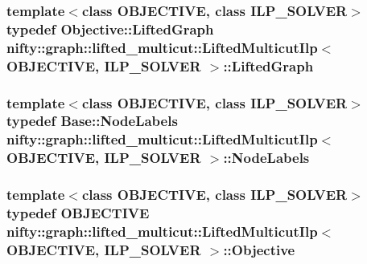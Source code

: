 \subsubsection[{Lifted\+Graph}]{\setlength{\rightskip}{0pt plus 5cm}template$<$class O\+B\+J\+E\+C\+T\+I\+V\+E, class I\+L\+P\+\_\+\+S\+O\+L\+V\+E\+R$>$ typedef Objective\+::\+Lifted\+Graph {\bf nifty\+::graph\+::lifted\+\_\+multicut\+::\+Lifted\+Multicut\+Ilp}$<$ O\+B\+J\+E\+C\+T\+I\+V\+E, I\+L\+P\+\_\+\+S\+O\+L\+V\+E\+R $>$\+::{\bf Lifted\+Graph}}\label{classnifty_1_1graph_1_1lifted__multicut_1_1LiftedMulticutIlp_a754b340c90447fa603a1d05c0ce0aa72}
\hypertarget{classnifty_1_1graph_1_1lifted__multicut_1_1LiftedMulticutIlp_ab9a112af2057c917ee8f86723df0fe19}{}
\subsubsection[{Node\+Labels}]{\setlength{\rightskip}{0pt plus 5cm}template$<$class O\+B\+J\+E\+C\+T\+I\+V\+E, class I\+L\+P\+\_\+\+S\+O\+L\+V\+E\+R$>$ typedef Base\+::\+Node\+Labels {\bf nifty\+::graph\+::lifted\+\_\+multicut\+::\+Lifted\+Multicut\+Ilp}$<$ O\+B\+J\+E\+C\+T\+I\+V\+E, I\+L\+P\+\_\+\+S\+O\+L\+V\+E\+R $>$\+::{\bf Node\+Labels}}\label{classnifty_1_1graph_1_1lifted__multicut_1_1LiftedMulticutIlp_ab9a112af2057c917ee8f86723df0fe19}
\hypertarget{classnifty_1_1graph_1_1lifted__multicut_1_1LiftedMulticutIlp_a9e7a118481038bcb5b4f1a41edd05b39}{}
\subsubsection[{Objective}]{\setlength{\rightskip}{0pt plus 5cm}template$<$class O\+B\+J\+E\+C\+T\+I\+V\+E, class I\+L\+P\+\_\+\+S\+O\+L\+V\+E\+R$>$ typedef O\+B\+J\+E\+C\+T\+I\+V\+E {\bf nifty\+::graph\+::lifted\+\_\+multicut\+::\+Lifted\+Multicut\+Ilp}$<$ O\+B\+J\+E\+C\+T\+I\+V\+E, I\+L\+P\+\_\+\+S\+O\+L\+V\+E\+R $>$\+::{\bf Objective}}\label{classnifty_1_1graph_1_1lifted__multicut_1_1LiftedMulticutIlp_a9e7a118481038bcb5b4f1a41edd05b39}
\hypertarget{classnifty_1_1graph_1_1lifted__multicut_1_1LiftedMulticutIlp_a1bc9b2e1c6bd45ec6d201a8150935edc}{}
